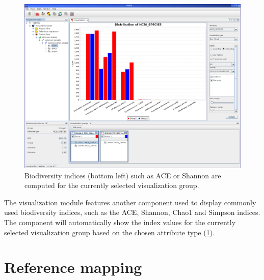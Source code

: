 \begin{figure}[H]
\centering
\includegraphics[width=\textwidth]{img/mgx/BioDiversity}
\caption[Biodiversity]{Biodiversity indices (bottom left) such as ACE or Shannon are computed for the currently
selected visualization group.}
\label{biodiv}
\end{figure}

The visualization module features another component used to display commonly used biodiversity indices, such as
the ACE, Shannon, Chao1 and Simpson indices. The component will automatically show the index values for the
currently selected visualization group based on the chosen attribute type (\ref{biodiv}).

\section{Reference mapping}

